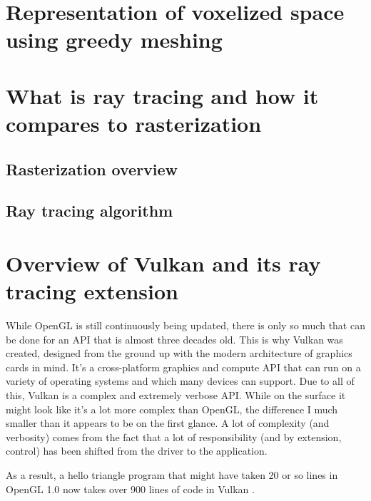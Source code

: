 \documentclass[times, utf8, zavrsni, numeric]{fer}
\begin{document}
\chapter{Representation of voxelized space using greedy meshing}

\chapter{What is ray tracing and how it compares to rasterization}
\section{Rasterization overview}

\section{Ray tracing algorithm}

\chapter{Overview of Vulkan and its ray tracing extension}
While OpenGL is still continuously being updated, there is only so much that can be done for an API that is almost three decades old. This is why Vulkan was created, designed from the ground up with the modern architecture of graphics cards in mind. It's a cross-platform graphics and compute API that can run on a variety of operating systems and which many devices can support. Due to all of this, Vulkan is a complex and extremely verbose API. While on the surface it might look like it's a lot more complex than OpenGL, the difference I much smaller than it appears to be on the first glance. A lot of complexity (and verbosity) comes from the fact that a lot of responsibility (and by extension, control) has been shifted from the driver to the application.

As a result, a hello triangle program that might have taken 20 or so lines in OpenGL 1.0 now takes over 900 lines of code in Vulkan \cite{vulkan_tutorial}.

\end{document}
